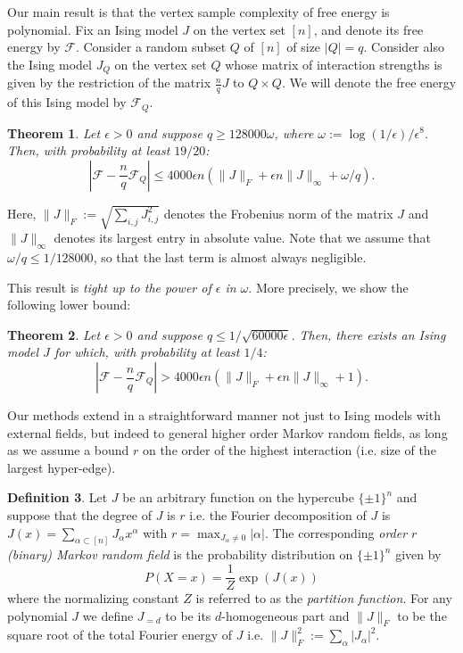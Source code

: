 \documentclass[final, 12pt]{colt2018}
\newcommand{\F}{\mathcal{F}}
\newtheorem{defn}[theorem]{Definition}
\newtheorem{theorem}{Theorem}[section]
\theoremstyle{definition}
\newtheorem{defn}[theorem]{Definition}
\theoremstyle{plain}
\begin{document}
Our main result is that the vertex sample complexity of free energy is polynomial. Fix an Ising model $J$ on the vertex set $[n]$, and denote its free energy by $\F$. Consider a random subset $Q$ of $[n]$ of size $|Q|=q$. Consider also the Ising model $J_Q$ on the vertex set $Q$ whose matrix of interaction strengths is given by the restriction of the matrix $\frac{n}{q}J$ to $Q\times Q$. We will denote the free energy of this Ising model by $\F_Q$. 
\begin{theorem}
\label{thm:sample-complexity-free-energy}
Let $\epsilon > 0$ and suppose $q \ge 128000\omega$, where $\omega:=\log(1/\epsilon)/\epsilon^{8}$. 
Then, with probability at least $19/20$:
$$\left|\F - \frac{n}{q}\F_Q\right| \leq 4000\epsilon n \left(\|J\|_F + \epsilon n \|J\|_{\infty} + \omega/q \right).$$
\end{theorem}
Here, $\|J\|_{F}:= \sqrt{\sum_{i,j}J_{i,j}^2}$ denotes the Frobenius norm of the matrix $J$ and $\|J\|_{\infty}$ denotes its largest entry in absolute value. Note that we assume that $\omega/q \le 1/128000$, so that the last term is almost always negligible. 

This result is \emph{tight up to the power of $\epsilon$ in $\omega$}. More precisely, we show the following lower bound:
\begin{theorem}
\label{thm:sample-complexity-lower-bound}
Let $\epsilon > 0$ and suppose $q \le 1/\sqrt{60000\epsilon}$. Then, there exists an Ising model $J$ for which, %
with probability at least $1/4$:
$$\left|\F - \frac{n}{q}\F_Q\right| > 4000\epsilon n \left(\|J\|_F + \epsilon n \|J\|_{\infty} + 1 \right).$$
\end{theorem} 


Our methods extend in a straightforward manner not just to Ising models with external fields, but indeed to general higher order Markov random fields, as long
as we assume a bound $r$ on the order of the highest interaction (i.e. size of the largest hyper-edge). 

\begin{defn}
Let $J$ be an arbitrary function on the hypercube $\{ \pm 1\}^n$
and suppose that the degree of $J$ is $r$ i.e. the Fourier decomposition of $J$ is $J(x) = \sum_{\alpha \subset [n]} J_{\alpha} x^{\alpha}$ with $r = \max_{J_{\alpha} \ne 0} |\alpha|$.
The corresponding \emph{order $r$ (binary) Markov random field} is the probability distribution
on $\{\pm 1\}^n$ given by
\[ P(X = x) = \frac{1}{Z}\exp(J(x)) \]
where the normalizing constant $Z$ is referred to as the \emph{partition function}.
For any polynomial $J$ we define $J_{=d}$ to be its $d$-homogeneous part and
 $\|J\|_F$ to be the square root of the total Fourier energy of $J$ i.e. $\|J\|_F^2 := \sum_{\alpha} |J_{\alpha}|^2$.
\end{defn}
\end{document}
